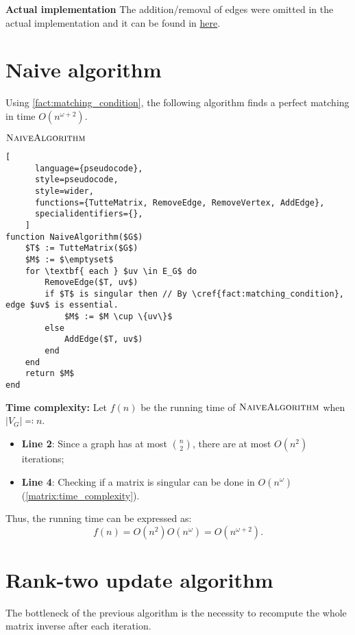 \textbf{Actual implementation}
The addition/removal of edges were omitted in the actual implementation and it can be found in 
\href{https://github.com/antoniomsah/algebraic-max-matching/blob/e4cbd397941041e953ea673bef6403575ee253bc/code/matrix/tutte-matrix.hpp}{here}.


\section{Naive algorithm}


Using \cref{fact:matching_condition}, the following algorithm finds a perfect matching in time \(O(n^{\omega+2})\).
\begin{programruledcaption}{\(\textsc{NaiveAlgorithm}\)}
    \begin{lstlisting}[
      language={pseudocode},
      style=pseudocode,
      style=wider,
      functions={TutteMatrix, RemoveEdge, RemoveVertex, AddEdge},
      specialidentifiers={},
    ]
function NaiveAlgorithm($G$)
    $T$ := TutteMatrix($G$)
    $M$ := $\emptyset$
    for \textbf{ each } $uv \in E_G$ do
        RemoveEdge($T, uv$)
        if $T$ is singular then // By \cref{fact:matching_condition}, edge $uv$ is essential.
            $M$ := $M \cup \{uv\}$
        else 
            AddEdge($T, uv$)
        end
    end
    return $M$ 
end
    \end{lstlisting}
\end{programruledcaption}
\noindent
\textbf{Time complexity:}
Let \(f(n)\) be the running time of \(\textsc{NaiveAlgorithm}\) when \(|V_G| \eqcolon n\).
\begin{itemize}
    \item \textbf{Line 2}: Since a graph has at most \(\binom{n}{2}\), there are at most \(O(n^2)\) iterations;
    \item \textbf{Line 4}: Checking if a matrix is singular can be done in \(O(n^\omega)\) (\cref{matrix:time_complexity}).
\end{itemize}
Thus, the running time can be expressed as:
\[
    f(n) = O(n^2) O(n^\omega) = O(n^{\omega+2}).
\]

\section{Rank-two update algorithm}

The bottleneck of the previous algorithm is the necessity to recompute the whole matrix inverse after each iteration.

